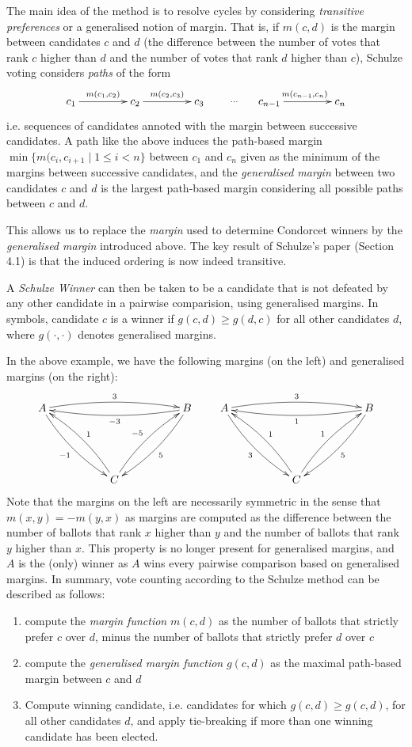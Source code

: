 \documentclass{llncs}
\begin{document}
The main idea of the method is to resolve cycles by considering
\emph{transitive preferences} or a generalised notion of margin.
That is, if $m(c, d)$ is the margin between candidates $c$ and $d$
(the difference between the number of votes that rank $c$ higher
than $d$ and the number of votes that rank $d$ higher than $c$),
Schulze voting considers \emph{paths} of the form
\[\xymatrix@C=10ex{ c_1  \ar[r]^{m(c_1, c_2)} & c_2 
  \ar[r]^{m(c_2,c_3)} & c_3 \ar@{}[r]|{\dots} & c_{n-1}
  \ar[r]^{m(c_{n-1}, c_n)} & c_n } \]
i.e. sequences of candidates annoted with the margin between
successive candidates. A path like the above induces the path-based
margin $\min \lbrace m(c_i, c_{i+1} \mid 1 \leq i < n
\rbrace$ between $c_1$ and $c_n$ given as the minimum of the margins
between successive candidates, and the \emph{generalised margin}
between two candidates $c$ and $d$ is the largest path-based margin
considering all possible paths between $c$ and $d$.


This allows us to replace the \emph{margin} used to determine
Condorcet winners by the \emph{generalised margin} introduced above.
The key result of Schulze's paper \cite{Schulze:2011:NMC} (Section
4.1)  is that
the induced ordering is now indeed transitive.

A \emph{Schulze Winner} can then be taken to be a candidate that is
not defeated by any other candidate in a pairwise comparision, using
generalised  margins. In symbols, candidate $c$ is a winner if $g(c,
d) \geq g(d,c)$ for all other candidates $d$, where $g(\cdot,
\cdot)$ denotes generalised margins.

In the above example, we have the following margins (on the left)
and generalised margins (on the right):
\[
\xymatrix@R=12ex@C=12ex{
A \ar@/^/[rr]^{3} \ar@/_/[dr]_{-1} & & B \ar@/^/[ll]^{-3}
\ar@/^/[dl]^5 \\
& C \ar@/_/[ul]_{1} \ar@/^/[ur]^{-5}
} \qquad \xymatrix@R=12ex@C=12ex{
A \ar@/^/[rr]^{3} \ar@/_/[dr]_{3} & & B \ar@/^/[ll]^{1}
\ar@/^/[dl]^5 \\
& C \ar@/_/[ul]_{1} \ar@/^/[ur]^{1}
}\]
Note that the margins on the left are necessarily symmetric in the sense that $m(x, y) =
-m(y, x)$ as margins are computed as the difference 
between the number of ballots that rank 
$x$ higher than $y$ and the number of ballots that rank $y$ higher
than $x$. This property is no longer present for generalised
margins, and $A$ is the (only) winner as $A$ wins every pairwise
comparison based on generalised margins.
%
In summary, vote counting according to the Schulze method can be
described as follows:
\begin{enumerate}
\item compute the \emph{margin function} $m(c, d)$ as the number of
ballots that strictly prefer $c$ over $d$, minus the number of
ballots that strictly prefer $d$ over $c$
\item compute the \emph{generalised margin function} $g(c, d)$ as
the maximal path-based margin between $c$ and $d$
\item Compute winning candidate, i.e. candidates for which $g(c, d)
\geq g(c, d)$, for all other candidates $d$, and apply tie-breaking
if more than one winning candidate has been elected.
\end{enumerate}
\end{document}
